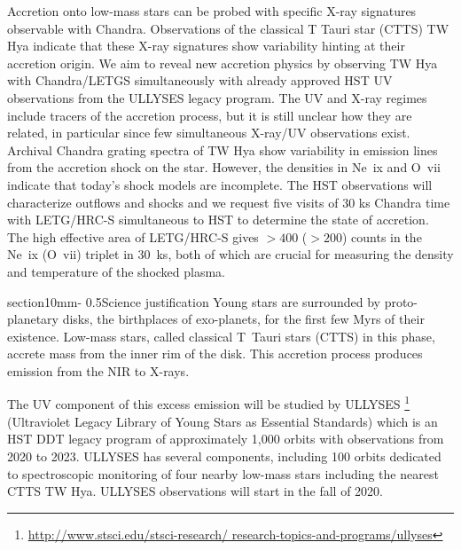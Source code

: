 \documentclass[letterpaper,11pt,twocolumn]{article}
\makeatletter
\renewcommand{\section}{\@startsection%
{section}{1}{0mm}{-\baselineskip}%
{0.5\baselineskip}{\normalfont\Large\bfseries}}%
\makeatother
\begin{document}

Accretion onto low-mass stars can be probed with specific X-ray
signatures observable with Chandra. Observations of the
classical T Tauri star (CTTS) TW Hya indicate that these X-ray
signatures show variability hinting at their accretion origin. We aim
to reveal new accretion physics by observing TW Hya with Chandra/LETGS
simultaneously with already approved HST UV observations from the ULLYSES
legacy program.
The UV and X-ray regimes include tracers of the
accretion process, but it is still unclear how they are related, in
particular since few simultaneous X-ray/UV observations
exist. Archival Chandra grating spectra of TW Hya show variability in emission
lines from the accretion shock on the star. However, the densities in
Ne~{\sc ix} and O~{\sc vii} indicate that today's shock models are
incomplete. 
The HST observations will characterize outflows and shocks and
we request five visits of 30 ks Chandra time with LETG/HRC-S
simultaneous to HST to determine the state of accretion. The high
effective area of LETG/HRC-S gives $> 400$ ($>200$) counts in the Ne~{\sc ix} (O~{\sc vii}) triplet in 30~ks, both of which are
crucial for measuring the density and temperature of the shocked plasma.


\section{Science justification}
Young stars are surrounded by proto-planetary disks, the birthplaces of exo-planets, for the first few Myrs of their existence. Low-mass stars, called classical T~Tauri stars (CTTS) in this phase, accrete mass from the inner rim of the disk. This accretion process produces emission from the NIR to X-rays.

The UV component of this excess emission will be studied by ULLYSES 
\footnote{\url{http://www.stsci.edu/stsci-research/ research-topics-and-programs/ullyses}}
(Ultraviolet Legacy Library of Young Stars as Essential Standards) which is an HST DDT legacy program of  approximately 1,000 orbits with observations from 2020 to 2023. ULLYSES has several components, including 100 orbits dedicated to spectroscopic monitoring of four nearby low-mass stars including the nearest CTTS TW Hya. ULLYSES observations will start in the fall of 2020.
\end{document}
